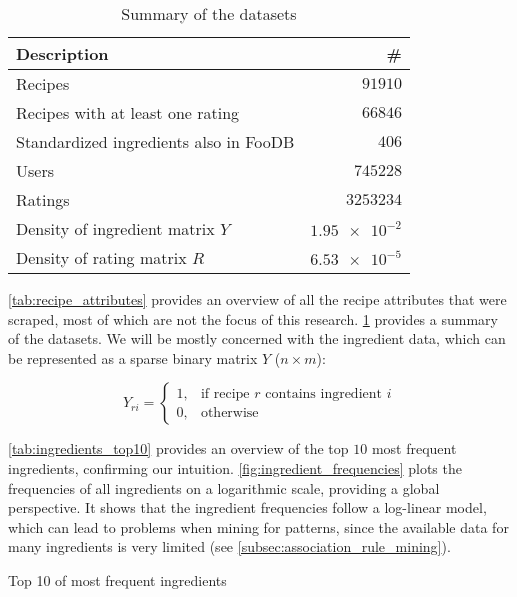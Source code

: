 \begin{table}[htbp]
	\caption{Summary of the datasets}
	\label{tab:dataset_summary}
	
	\centering
	\begin{tabular}{l r}
		\toprule
		\textbf{Description} & \textbf{\#} \\
		\midrule
		Recipes & $\num{91910}$ \\
		Recipes with at least one rating & $\num{66846}$ \\
		Standardized ingredients also in FooDB & $\num{406}$ \\
		Users & $\num{745228}$ \\
		Ratings & $\num{3253234}$ \\ 
		Density of ingredient matrix $Y$ & $\num{1.95e-2}$ \\
		Density of rating matrix $R$ & $\num{6.53e-5}$ \\
		\bottomrule
	\end{tabular}
\end{table}


\cref{tab:recipe_attributes} provides an overview of all the recipe attributes that were scraped, most of which are not the focus of this research.
\cref{tab:dataset_summary} provides a summary of the datasets.
We will be mostly concerned with the ingredient data, which can be represented as a sparse binary matrix $Y$ ($n \times m$):

\begin{equation*}
	\tag{Ingredient matrix}
	Y_{ri}=
	\begin{cases}
	    1,& \text{if recipe } r \text{ contains ingredient } i \\
	    0,& \text{otherwise}
	\end{cases}
\end{equation*}

\cref{tab:ingredients_top10} provides an overview of the top $10$ most frequent ingredients, confirming our intuition.
\cref{fig:ingredient_frequencies} plots the frequencies of all ingredients on a logarithmic scale, providing a global perspective.
It shows that the ingredient frequencies follow a log-linear model, which can lead to problems when mining for patterns, since the available data for many ingredients is very limited (see \cref{subsec:association_rule_mining}).

\begin{table}[htbp]
	\caption{Top 10 of most frequent ingredients}
	\label{tab:ingredients_top10}
	
	\centering
		
\end{table}

